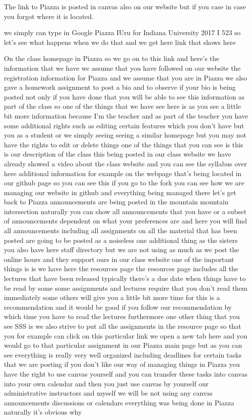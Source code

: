 The link to Piazza is posted in canvas also on our website but if you case in case you forgot where it is located.


 we simply can type in Google Piazza IUru for Indiana University 2017 I 523 so let's see what happens when we do that and we get here link that shows here 


On the class homepage in Piazza so we go on to this link and here's the information that we have we assume that you have followed on our website the registration information for Piazza and we assume that you are in Piazza we also gave a homework assignment to post a bio and to observe if your bio is being posted not only if you have done that you will be able to see this information as part of the class so one of the things that we have see here is as you see a little bit more information because I'm the teacher and as part of the teacher you have some additional rights such as editing certain features which you don't have but you as a student or we simply seeing seeing a similar homepage but you may not have the rights to edit or delete things one of the things that you can see is this is our description of the class this being posted in our class website we have already showed a video about the class website and you can see the syllabus over here additional information for example on the webpage that's being located in our github page so you can see this if you go to the fork you can see how we are managing our website in github and everything being managed there let's get back to Piazza announcements are being posted in the mountain mountain intersection naturally you can show all announcements that you have or a subset of announcements dependent on what your preferences are and here you will find all announcements including all assignments on all the material that has been posted are going to be posted as a noiseless one additional thing as the sisters you also have here staff directory but we are not using as much as we post the online hours and they support ours in our class website one of the important things is is we have here the resources page the resources page includes all the lectures that have been released typically there's a due date when things have to be read by some some assignments and lectures require that you don't read them immediately some others will give you a little bit more time for this is a recommendation and it would be good if you follow our recommendation by which time you have to read the lectures furthermore one other thing that you see SSS is we also strive to put all the assignments in the resource page so that you for example can click on this particular link we open a new tab here and you would go to that particular assignment in our Piazza main page but as you can see everything is really very well organized including deadlines for certain tasks that we are posting if you don't like our way of managing things in Piazza you have the right to use canvas yourself and you can transfer these tasks into canvas into your own calendar and then you just use canvas by yourself our administrative instructors and myself we will be not using any canvas announcements discussions or calendars everything was being done in Piazza naturally it's obvious why 